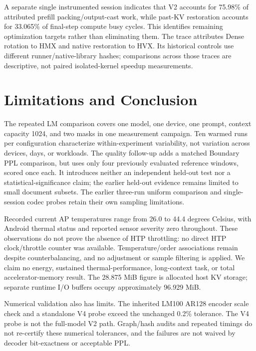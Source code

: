 \documentclass[conference,a4paper,10pt]{IEEEtran}
\begin{document}
A separate single instrumented session indicates that V2 accounts for 75.98\% of attributed prefill packing/output-cast work, while past-KV restoration accounts for 33.065\% of final-step compute busy cycles. This identifies remaining optimization targets rather than eliminating them. The trace attributes Dense rotation to HMX and native restoration to HVX. Its historical controls use different runner/native-library hashes; comparisons across those traces are descriptive, not paired isolated-kernel speedup measurements.

\section{Limitations and Conclusion}
The repeated LM comparison covers one model, one device, one prompt, context capacity 1024, and two masks in one measurement campaign. Ten warmed runs per configuration characterize within-experiment variability, not variation across devices, days, or workloads. The quality follow-up adds a matched Boundary PPL comparison, but uses only four previously evaluated reference windows, scored once each. It introduces neither an independent held-out test nor a statistical-significance claim; the earlier held-out evidence remains limited to small document subsets. The earlier three-run uniform comparison and single-session codec probes retain their own sampling limitations.

Recorded current AP temperatures range from 26.0 to 44.4 degrees Celsius, with Android thermal status and reported sensor severity zero throughout. These observations do not prove the absence of HTP throttling: no direct HTP clock/throttle counter was available. Temperature/order associations remain despite counterbalancing, and no adjustment or sample filtering is applied. We claim no energy, sustained thermal-performance, long-context task, or total accelerator-memory result. The 28.875 MiB figure is allocated host KV storage; separate runtime I/O buffers occupy approximately 96.929 MiB.

Numerical validation also has limits. The inherited LM100 AR128 encoder scale check and a standalone V4 probe exceed the unchanged 0.2\% tolerance. The V4 probe is not the full-model V2 path. Graph/hash audits and repeated timings do not re-certify these numerical tolerances, and the failures are not waived by decoder bit-exactness or acceptable PPL.
\end{document}

